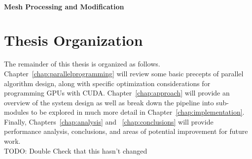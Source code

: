 \paragraph{Mesh Processing and Modification}
\section{Thesis Organization} %
The remainder of this thesis is organized as follows. Chapter~\ref{chap:parallelprogramming} will review some basic precepts of parallel algorithm design, along with specific optimization considerations for programming GPUs with CUDA. Chapter~\ref{chap:approach} will provide an overview of the system design as well as break down the pipeline into sub-modules to be explored in much more detail in Chapter~\ref{chap:implementation}. Finally, Chapters~\ref{chap:analysis} and ~\ref{chap:conclusions} will provide performance analysis, conclusions, and areas of potential improvement for future work.\\
{\color{red} TODO: Double Check that this hasn't changed}